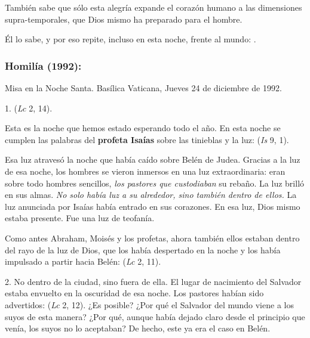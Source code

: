 \begin{body}
\begin{body}
		También sabe que sólo esta alegría expande el corazón humano a las dimensiones supra-temporales, que Dios mismo ha preparado para el hombre.

		Él lo sabe, y por eso repite, incluso en esta noche, frente al mundo: .
	\end{body}

	\subsubsection{Homilía (1992):}

	Misa en la Noche Santa. Basílica Vaticana, Jueves 24 de diciembre de 1992.

	\begin{body}
		1.  (\emph{Lc} 2, 14).

		Esta es la noche que hemos estado esperando todo el año. En esta noche se cumplen las palabras del \textbf{profeta Isaías} sobre las tinieblas y la luz:  (\emph{Is} 9, 1).

		Esa luz atravesó la noche que había caído sobre Belén de Judea. Gracias a la luz de esa noche, los hombres se vieron inmersos en una luz extraordinaria: eran sobre todo hombres sencillos, \emph{los pastores que custodiaban} su rebaño. La luz brilló en sus almas. \emph{No solo había luz a su alrededor, sino también dentro de ellos.} La luz anunciada por Isaías había entrado en sus corazones. En esa luz, Dios mismo estaba presente. Fue una luz de teofanía.

		Como antes Abraham, Moisés y los profetas, ahora también ellos estaban dentro del rayo de la luz de Dios, que los había despertado en la noche y los había impulsado a partir hacia Belén:  (\emph{Lc} 2, 11).

		2. No dentro de la ciudad, sino fuera de ella. El lugar de nacimiento del Salvador estaba envuelto en la oscuridad de esa noche. Los pastores habían sido advertidos:  (\emph{Lc} 2, 12). ¿Es posible? ¿Por qué el Salvador del mundo viene a los suyos de esta manera? ¿Por qué, aunque había dejado claro desde el principio que venía, los suyos no lo aceptaban? De hecho, este ya era el caso en Belén.


\end{body}
\end{body}
